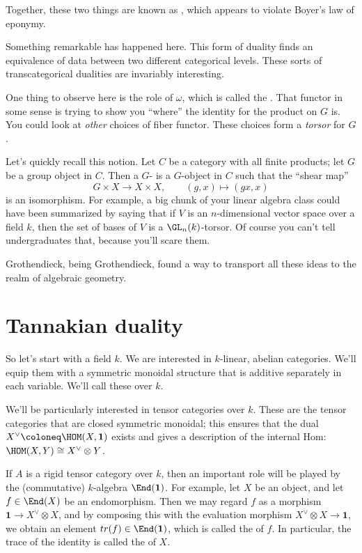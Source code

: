 \documentclass[leqno]{article}
\begin{document}
Together, these two things are known as
,
which appears to violate Boyer's law of eponymy.

Something remarkable has happened here.
This form of duality finds an equivalence of data between
two different categorical levels.
These sorts of transcategorical dualities are invariably interesting.

One thing to observe here is the role of \(\omega\),
which is called the .
That functor in some sense is trying to show you \enquote{where}
the identity for the product on \(G\) is.
You could look at \emph{other} choices of fiber functor.
These choices form
a \emph{torsor} for \(G\).

Let's quickly recall this notion.
Let \(C\) be a category with all finite products;
let \(G\) be a group object in \(C\).
Then a \(G\)- is a \(G\)-object in \(C\)
such that the \enquote{shear map}
\begin{equation*}
    G \times X \to X \times X \comma \qquad
    (g,x) \mapsto (gx, x)
\end{equation*}
is an isomorphism.
For example, a big chunk of your linear algebra class
could have been summarized by saying that
if \(V\) is an \(n\)-dimensional vector space over a field \(k\),
then the set of bases of \(V\) is a \(\GL_n(k)\)-torsor.
Of course you can't tell undergraduates that,
because you'll scare them.

Grothendieck, being Grothendieck, found a way
to transport all these ideas to the realm of algebraic geometry.

\section{Tannakian duality}%
\label{tannakian}

So let's start with a field \(k\).
We are interested in \(k\)-linear, abelian categories.
We'll equip them with a symmetric monoidal structure
that is additive separately in each variable.
We'll call these  over \(k\).

We'll be particularly interested in  tensor categories
over \(k\).
These are the tensor categories that are closed symmetric monoidal;
this ensures that the dual \(X^{\vee} \coloneq \HOM(X,\mathbf{1})\)
exists and gives a description of the internal Hom:
\(\HOM(X,Y) \cong X^{\vee}\otimes Y\).

If \(A\) is a rigid tensor category over \(k\), then
an important role will be played by the (commutative) \(k\)-algebra
\(\End(\mathbf{1})\).
For example, let \(X\) be an object, and
let \(f \in \End(X)\) be an endomorphism.
Then we may regard \(f\) as a morphism
\(\mathbf{1} \to X^{\vee} \otimes X\),
and by composing this with the evaluation morphism
\(X^{\vee} \otimes X \to  \mathbf{1}\),
we obtain an element \(\mathop{tr}(f) \in \End(\mathbf{1})\),
which is called the  of \(f\).
In particular, the trace of the identity is called
the  of \(X\).
\end{document}

